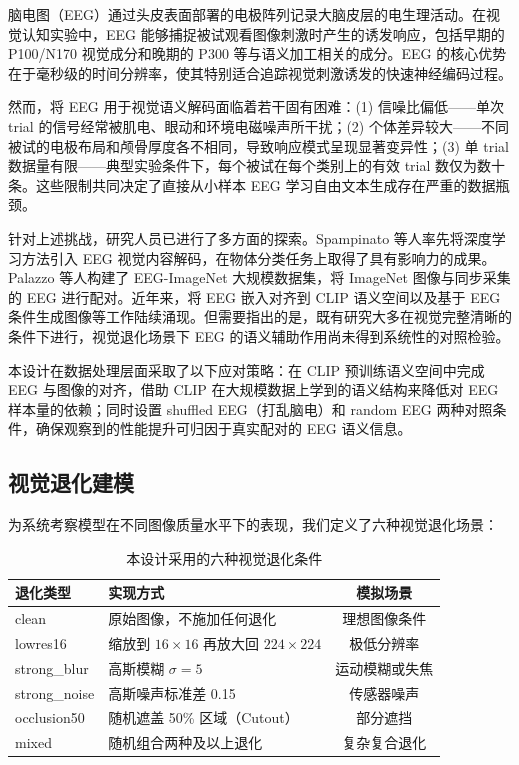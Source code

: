 脑电图（EEG）通过头皮表面部署的电极阵列记录大脑皮层的电生理活动。在视觉认知实验中，EEG 能够捕捉被试观看图像刺激时产生的诱发响应，包括早期的 P100/N170 视觉成分和晚期的 P300 等与语义加工相关的成分。EEG 的核心优势在于毫秒级的时间分辨率，使其特别适合追踪视觉刺激诱发的快速神经编码过程。

然而，将 EEG 用于视觉语义解码面临着若干固有困难：(1) 信噪比偏低——单次 trial 的信号经常被肌电、眼动和环境电磁噪声所干扰；(2) 个体差异较大——不同被试的电极布局和颅骨厚度各不相同，导致响应模式呈现显著变异性；(3) 单 trial 数据量有限——典型实验条件下，每个被试在每个类别上的有效 trial 数仅为数十条。这些限制共同决定了直接从小样本 EEG 学习自由文本生成存在严重的数据瓶颈。

针对上述挑战，研究人员已进行了多方面的探索。Spampinato 等人率先将深度学习方法引入 EEG 视觉内容解码，在物体分类任务上取得了具有影响力的成果。Palazzo 等人构建了 EEG-ImageNet 大规模数据集，将 ImageNet 图像与同步采集的 EEG 进行配对。近年来，将 EEG 嵌入对齐到 CLIP 语义空间以及基于 EEG 条件生成图像等工作陆续涌现。但需要指出的是，既有研究大多在视觉完整清晰的条件下进行，视觉退化场景下 EEG 的语义辅助作用尚未得到系统性的对照检验。

本设计在数据处理层面采取了以下应对策略：在 CLIP 预训练语义空间中完成 EEG 与图像的对齐，借助 CLIP 在大规模数据上学到的语义结构来降低对 EEG 样本量的依赖；同时设置 shuffled EEG（打乱脑电）和 random EEG 两种对照条件，确保观察到的性能提升可归因于真实配对的 EEG 语义信息。

\subsection{视觉退化建模}

为系统考察模型在不同图像质量水平下的表现，我们定义了六种视觉退化场景：

\begin{table}[h]
\centering
\caption{本设计采用的六种视觉退化条件}
\label{tab:degradations}
\begin{tabular}{llc}
\toprule
退化类型 & 实现方式 & 模拟场景 \\
\midrule
clean & 原始图像，不施加任何退化 & 理想图像条件 \\
lowres16 & 缩放到 $16\times16$ 再放大回 $224\times224$ & 极低分辨率 \\
strong\_blur & 高斯模糊 $\sigma=5$ & 运动模糊或失焦 \\
strong\_noise & 高斯噪声标准差 0.15 & 传感器噪声 \\
occlusion50 & 随机遮盖 50\% 区域（Cutout） & 部分遮挡 \\
mixed & 随机组合两种及以上退化 & 复杂复合退化 \\
\bottomrule
\end{tabular}
\end{table}

